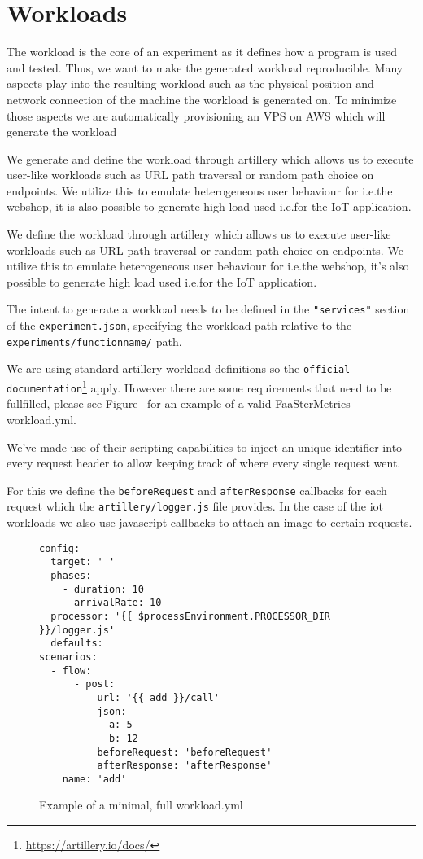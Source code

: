 \documentclass[../main.tex]{subfiles}
\begin{document}
\section{Workloads}\label{sec:WorkloadsStructure}

The workload is the core of an experiment as it defines how a program is used and tested. 
Thus, we want to make the generated workload reproducible. 
Many aspects play into the resulting workload such as the physical position and network connection of the machine the workload is generated on. 
To minimize those aspects we are automatically provisioning an VPS on AWS which will generate the workload

We generate and define the workload through artillery which allows us to execute user-like workloads 
such as URL path traversal or random path choice on endpoints. 
We utilize this to emulate heterogeneous user behaviour for i.e.\@ the webshop, 
it is also possible to generate high load used i.e.\@ for the IoT application.

We define the workload through artillery which allows us to execute user-like workloads such as URL path traversal or random path choice on endpoints. We utilize this to emulate heterogeneous user behaviour for i.e.\@ the webshop, it's also possible to generate high load used i.e.\@ for the IoT application.

The intent to generate a workload needs to be defined in the \texttt{"services"} section of the \texttt{experiment.json}, specifying the workload path relative to the \texttt{experiments/functionname/} path. %

We are using standard artillery workload-definitions so the \texttt{official documentation}\footnote{\url{https://artillery.io/docs/}} apply. However there are some requirements that need to be fullfilled, please see Figure~ for an example of a valid FaaSterMetrics workload.yml.

We've made use of their scripting capabilities to inject an unique identifier into every request header to allow keeping track of where every single request went. 

For this we define the \texttt{beforeRequest} and \texttt{afterResponse} callbacks for each request which the \texttt{artillery/logger.js} file provides.
In the case of the iot workloads we also use javascript callbacks to attach an image to certain requests.

\begin{figure}[H]
  \begin{tcolorbox}[titleDetachedStyle, title=\texttt{workload.yml}]
  \begin{verbatim}
config:
  target: ' '
  phases:
    - duration: 10
      arrivalRate: 10
  processor: '{{ $processEnvironment.PROCESSOR_DIR }}/logger.js'
  defaults:
scenarios:
  - flow:
      - post:
          url: '{{ add }}/call'
          json:
            a: 5
            b: 12
          beforeRequest: 'beforeRequest'
          afterResponse: 'afterResponse'
    name: 'add'
\end{verbatim}
\end{tcolorbox}
\caption{Example of a minimal, full workload.yml}%
\label{fig:exampleWorkloadYML}
\end{figure}
\end{document}
